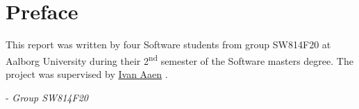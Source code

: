\chapter*{Preface}

This report was written by four Software students from group SW814F20 at Aalborg University during their 2\textsuperscript{nd} semester of the Software masters degree.
The project was supervised by \href{https://vbn.aau.dk/da/persons/110538}{Ivan Aaen} \cite{IvanAaen}.

- \textit{Group SW814F20}

\newpage